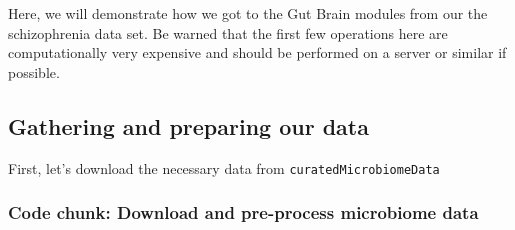 \documentclass[
]{article}
\begin{document}
Here, we will demonstrate how we got to the Gut Brain modules from our
the schizophrenia data set. Be warned that the first few operations here
are computationally very expensive and should be performed on a server
or similar if possible.

\hypertarget{gathering-and-preparing-our-data-1}{%
\subsection{Gathering and preparing our
data}\label{gathering-and-preparing-our-data-1}}

First, let's download the necessary data from
\texttt{curatedMicrobiomeData}

\hypertarget{code-chunk-download-and-pre-process-microbiome-data}{%
\subsubsection{Code chunk: Download and pre-process microbiome
data}\label{code-chunk-download-and-pre-process-microbiome-data}}
\end{document}

